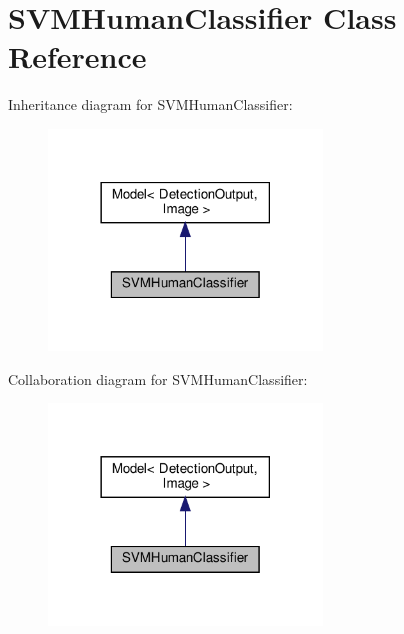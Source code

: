 \hypertarget{classSVMHumanClassifier}{}\section{S\+V\+M\+Human\+Classifier Class Reference}
\label{classSVMHumanClassifier}


Inheritance diagram for S\+V\+M\+Human\+Classifier\+:\nopagebreak
\begin{figure}[H]
\begin{center}
\leavevmode
\includegraphics[width=206pt]{classSVMHumanClassifier__inherit__graph}
\end{center}
\end{figure}


Collaboration diagram for S\+V\+M\+Human\+Classifier\+:\nopagebreak
\begin{figure}[H]
\begin{center}
\leavevmode
\includegraphics[width=206pt]{classSVMHumanClassifier__coll__graph}
\end{center}
\end{figure}
